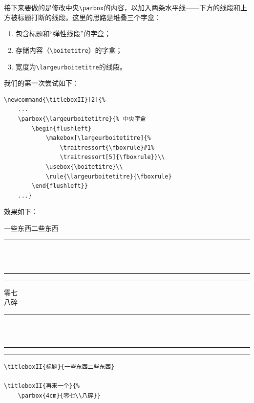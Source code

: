 接下来要做的是修改中央\verb|\parbox|的内容，以加入两条水平线——下方的线段和上方被标题打断的线段。这里的思路是堆叠三个字盒：

\begin{enumerate}
    \item 包含标题和``弹性线段''的字盒；
    \item 存储内容（\verb|\boitetitre|）的字盒；
    \item 宽度为\verb|\largeurboitetitre|的线段。
\end{enumerate}

我们的第一次尝试如下：

\begin{dmd}
\begin{verbatim}
\newcommand{\titleboxII}[2]{% 
    ...
    \parbox{\largeurboitetitre}{% 中央字盒
        \begin{flushleft}
            \makebox[\largeurboitetitre]{% 
                \traitressort{\fboxrule}#1% 
                \traitressort[5]{\fboxrule}}\\
            \usebox{\boitetitre}\\
            \rule{\largeurboitetitre}{\fboxrule}
        \end{flushleft}}
    ...}\end{verbatim}
\end{dmd}

\newcommand{\titleboxII}[2]{%
  \begin{lrbox}{\boitetitre}%
    \kern\fboxsep#2\kern\fboxsep
  \end{lrbox}
  \settowidth{\largeurboitetitre}{\usebox{\boitetitre}}%
  \settoheight{\hauteurboitetitre}{\usebox{\boitetitre}}%
  \settodepth{\tempdim}{\usebox{\boitetitre}}%
  \addtolength{\hauteurboitetitre}{\tempdim+2\fboxrule+2\fboxsep}%
  \parbox{\fboxrule}{%
    \rule{\fboxrule}{\hauteurboitetitre}}%
  \parbox{\largeurboitetitre}{%
    \begin{flushleft}
      \makebox[\largeurboitetitre]{%
        \traitressort{\fboxrule}#1\traitressort[5]{\fboxrule}}\\
      \usebox{\boitetitre}\\
      \rule{\largeurboitetitre}{\fboxrule}
    \end{flushleft}}%
  \parbox{\fboxrule}{%
    \rule{\fboxrule}{\hauteurboitetitre}}}

效果如下：

\begin{codelist}[10.20]{
    \titleboxII{标题}{一些东西二些东西}

    \titleboxII{再来一个}{%
        \parbox{4cm}{零七\\八碎}}
}
\begin{verbatim}
\titleboxII{标题}{一些东西二些东西}

\titleboxII{再来一个}{%
    \parbox{4cm}{零七\\八碎}}\end{verbatim}
\end{codelist}

